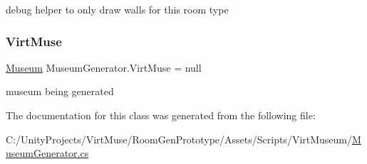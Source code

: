 debug helper to only draw walls for this room type 

\mbox{\label{class_museum_generator_abd9c3bf24730c6ad36b0ae78838ffaa8}} 
\subsubsection{\texorpdfstring{Virt\+Muse}{VirtMuse}}
{\footnotesize\ttfamily \mbox{\hyperlink{class_museum}{Museum}} Museum\+Generator.\+Virt\+Muse = null}



museum being generated 



The documentation for this class was generated from the following file\+:\begin{DoxyCompactItemize}
\item 
C\+:/\+Unity\+Projects/\+Virt\+Muse/\+Room\+Gen\+Prototype/\+Assets/\+Scripts/\+Virt\+Museum/\mbox{\hyperlink{_museum_generator_8cs}{Museum\+Generator.\+cs}}\end{DoxyCompactItemize}
